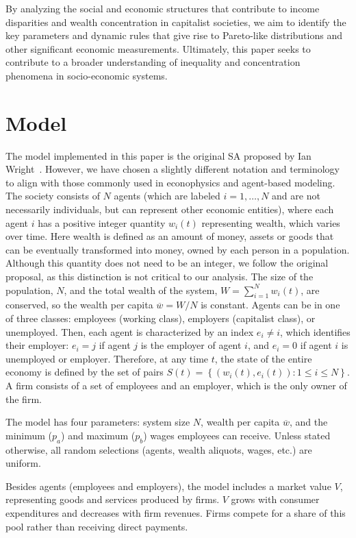 \documentclass[11pt,a4paper]{revtex4-1}
\begin{document}
By analyzing the social and economic structures that contribute to income disparities and wealth concentration in capitalist societies, we aim to identify the key parameters and dynamic rules that give rise to Pareto-like distributions and other significant economic measurements. Ultimately, this paper seeks to contribute to a broader understanding of inequality and concentration phenomena in socio-economic systems.

\section{Model}

The model implemented in this paper is the original SA proposed by Ian Wright~\cite{WRIGHT2005589}. However, we have chosen a slightly different notation and terminology to align with those commonly used in econophysics and agent-based modeling.
The society consists of $N$ agents (which are labeled $i=1,\dots,N$ and are not necessarily individuals, but can represent other economic entities), where each agent $i$ has a positive integer quantity $w_i(t)$ representing wealth, 
which varies over time. 
Here wealth is defined as an amount of money, assets or goods that can be eventually transformed into money, owned by each person in a population. Although this quantity does not need to be an integer, we follow the original proposal, as this distinction is not critical to our analysis.
%
The size of the population, $N$, and the total wealth of the system, $W= \sum_{i=1}^N w_i(t)$, are conserved, so the wealth per capita $\overline{w}=W/N$ is constant. 
Agents can be in one of three classes: employees (working class), employers (capitalist class), or unemployed. 
Then, each agent is characterized by an index $e_i\neq i$, which identifies their employer: $e_i = j$ if agent $j$ is the employer of agent $i$, and $e_i = 0$ if agent $i$ is unemployed or employer.
Therefore, at any time $t$,  the state of the entire economy is defined by the set of pairs $S(t) = \left\{ \left( w_i(t), e_i(t) \right) :1\leq i\leq N \right\}$.
%
A firm consists of a set of employees and an employer, which is the only owner of the firm.

The model has four parameters: system size $N$, wealth per capita $\overline{w}$, and the minimum ($p_a$) and maximum ($p_b$) wages employees can receive. Unless stated otherwise, all random selections (agents, wealth aliquots, wages, etc.) are uniform.

 Besides agents (employees and employers), the model includes a market value $V$, representing goods and services produced by firms. $V$ grows with consumer expenditures and decreases with firm revenues. Firms compete for a share of this pool rather than receiving direct payments. 
\end{document}
